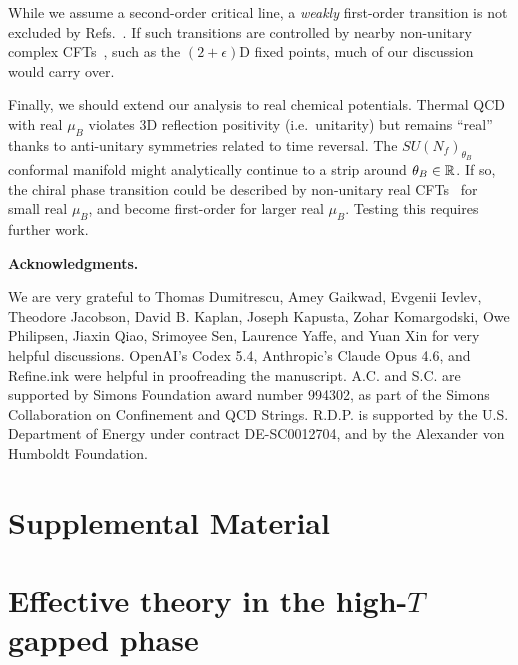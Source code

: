 \documentclass[
 reprint,







nofootinbib,


 amsmath,amssymb,
 aps,
 prd






tightenlines
]{revtex4-2}
\begin{document}
While we assume a second-order critical line, a \emph{weakly}
first-order transition is not excluded by
Refs.~\cite{Cuteri:2021ikv,Dini:2021hug,Nakamura:2022abk,Zhang:2022kzb,Zhang:2024ldl,Zhang:2025vns,Klinger:2025xxb,DAmbrosio:2025ldv,Klinger:2026pbe}.
If such transitions are controlled by nearby
non-unitary complex CFTs~\cite{Gorbenko:2018ncu,Gorbenko:2018dtm}, such
as the $(2+\epsilon)$D fixed points, much of our discussion would carry
over.

Finally, we should extend our analysis to real chemical
potentials. Thermal QCD with real $\mu_B$ violates 3D reflection
positivity (i.e.~unitarity) but remains ``real'' thanks to anti-unitary
symmetries related to time reversal. The $SU(N_f)_{\theta_B}$
conformal manifold might analytically continue to a strip around
$\theta_B\in\mathbb{R}$. If so, the chiral phase transition could be described
by non-unitary real CFTs~\cite{Gorbenko:2018ncu,Gorbenko:2018dtm} for
small real $\mu_B$, and become first-order for larger real $\mu_B$.
Testing this requires further work.



{\bf Acknowledgments.}


We are very grateful to Thomas Dumitrescu, Amey Gaikwad, Evgenii Ievlev, Theodore Jacobson, David B. Kaplan, Joseph Kapusta, Zohar Komargodski, Owe Philipsen, Jiaxin Qiao, Srimoyee Sen, Laurence Yaffe, and Yuan Xin for very helpful discussions.
OpenAI's Codex
5.4, Anthropic's Claude Opus 4.6, and Refine.ink were helpful in
proofreading the manuscript. A.C. and S.C. are supported by Simons
Foundation award number 994302, as part of the Simons Collaboration on Confinement and QCD Strings. R.D.P. is supported by the U.S.
Department of Energy under contract DE-SC0012704, and by the Alexander
von Humboldt Foundation.



\onecolumngrid
\appendix
\renewcommand{\thesection}{S\arabic{section}}

\newpage

\section*{Supplemental Material}




\section[Effective theory in the high-T gapped phase]{Effective theory in the high-$T$ gapped phase}
\label{sec:high_T_EFT}
\end{document}
